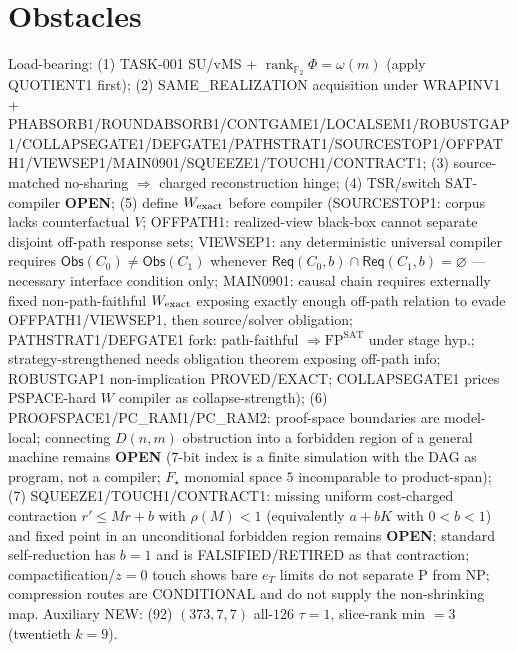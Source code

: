 \documentclass[11pt]{article}
\begin{document}
\section*{Obstacles}
Load-bearing: (1) TASK-001 SU/vMS + $\operatorname{rank}_{\mathbb F_2}\Phi=\omega(m)$ (apply QUOTIENT1 first);
(2) SAME\_REALIZATION acquisition under WRAPINV1 + PHABSORB1/ROUNDABSORB1/CONTGAME1/LOCALSEM1/ROBUSTGAP1/COLLAPSEGATE1/DEFGATE1/PATHSTRAT1/SOURCESTOP1/OFFPATH1/VIEWSEP1/MAIN0901/SQUEEZE1/TOUCH1/CONTRACT1;
(3) source-matched no-sharing $\Rightarrow$ charged reconstruction hinge;
(4) TSR/switch SAT-compiler \textbf{OPEN};
(5) define $W_{\rm exact}$ before compiler (SOURCESTOP1: corpus lacks counterfactual $V$;
OFFPATH1: realized-view black-box cannot separate disjoint off-path response sets;
VIEWSEP1: any deterministic universal compiler requires $\mathsf{Obs}(C_0)\ne\mathsf{Obs}(C_1)$
whenever $\mathsf{Req}(C_0,b)\cap\mathsf{Req}(C_1,b)=\varnothing$ --- necessary interface condition only;
MAIN0901: causal chain requires externally fixed non-path-faithful $W_{\rm exact}$ exposing
exactly enough off-path relation to evade OFFPATH1/VIEWSEP1, then source/solver obligation;
PATHSTRAT1/DEFGATE1 fork: path-faithful $\Rightarrow\mathrm{FP}^{\mathrm{SAT}}$ under stage hyp.;
strategy-strengthened needs obligation theorem exposing off-path info;
ROBUSTGAP1 non-implication PROVED/EXACT; COLLAPSEGATE1 prices PSPACE-hard $W$ compiler as collapse-strength);
(6) PROOFSPACE1/PC\_RAM1/PC\_RAM2: proof-space boundaries are model-local; connecting $D(n,m)$ obstruction into a
forbidden region of a general machine remains \textbf{OPEN} ($7$-bit index is a finite simulation with the DAG as program, not a compiler; $F_\star$ monomial space $5$ incomparable to product-span);
(7) SQUEEZE1/TOUCH1/CONTRACT1: missing uniform cost-charged contraction $r'\le Mr+b$ with $\rho(M){<}1$ (equivalently $a+bK$ with $0{<}b{<}1$) and fixed point in an unconditional forbidden region remains \textbf{OPEN};
standard self-reduction has $b{=}1$ and is FALSIFIED/RETIRED as that contraction; compactification/$z{=}0$ touch shows bare $e_T$ limits do not separate P from NP;
compression routes are CONDITIONAL and do not supply the non-shrinking map.
Auxiliary NEW: (92) $(373,7,7)$ all-$126$ $\tau{=}1$, slice-rank min $=3$ (twentieth $k{=}9$).
\end{document}
